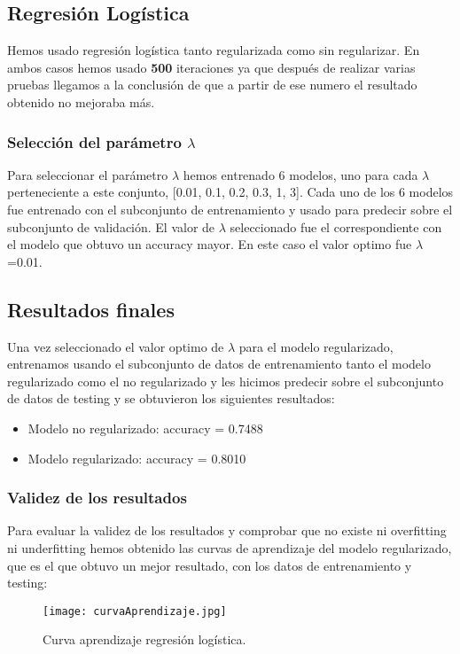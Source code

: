 \documentclass[11pt,spanish]{article}
\begin{document}
\subsection{Regresión Logística}
Hemos usado regresión logística tanto regularizada como sin regularizar. En ambos casos hemos usado \textbf{500} iteraciones ya que después de realizar varias pruebas llegamos a la conclusión de que a partir de ese numero el resultado obtenido no mejoraba más.

\subsubsection{Selección del parámetro $\lambda$}
Para seleccionar el parámetro $\lambda$ hemos entrenado 6 modelos, uno para cada $\lambda$ perteneciente a este conjunto, [0.01, 0.1, 0.2, 0.3, 1, 3]. Cada uno de los 6 modelos fue entrenado con el subconjunto de entrenamiento y usado para predecir sobre el subconjunto de validación. El valor de $\lambda$ seleccionado fue el correspondiente con el modelo que obtuvo un accuracy mayor. En este caso el valor optimo fue $\lambda$=0.01.

\subsection{Resultados finales}
Una vez seleccionado el valor optimo de $\lambda$ para el modelo regularizado, entrenamos usando el subconjunto de datos de entrenamiento tanto el modelo regularizado como el no regularizado y les hicimos predecir sobre el subconjunto de datos de testing y se obtuvieron los siguientes resultados:

\begin{itemize}
    \item Modelo no regularizado: accuracy = 0.7488 
	\item Modelo regularizado: accuracy = 0.8010
\end{itemize}

\subsubsection{Validez de los resultados}
Para evaluar la validez de los resultados y comprobar que no existe ni overfitting ni underfitting hemos obtenido las curvas de aprendizaje del modelo regularizado, que es el que obtuvo un mejor resultado, con los datos de entrenamiento y testing:
\newline

\begin{figure}[H]
  \centering
  \texttt{[image: curvaAprendizaje.jpg]}
  \caption{Curva aprendizaje regresión logística.}
\end{figure}
\end{document}
